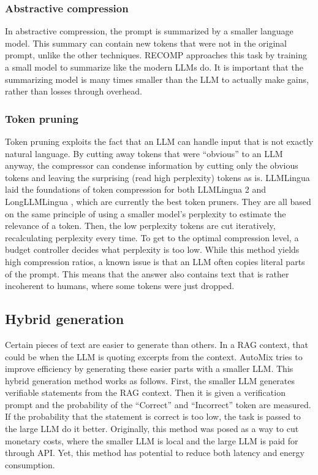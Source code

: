 \subsubsection{Abstractive compression}
In abstractive compression, the prompt is summarized by a smaller language model. This summary can contain new tokens that were not in the original prompt, unlike the other techniques. RECOMP \cite{xu2023recomp} approaches this task by training a small model to summarize like the modern LLMs do. It is important that the summarizing model is many times smaller than the LLM to actually make gains, rather than losses through overhead.

\subsubsection{Token pruning}
Token pruning exploits the fact that an LLM can handle input that is not exactly natural language. By cutting away tokens that were ``obvious'' to an LLM anyway, the compressor can condense information by cutting only the obvious tokens and leaving the surprising (read high perplexity) tokens as is. LLMLingua \cite{jiang2023llmlingua} laid the foundations of token compression for both LLMLingua 2 \cite{pan2024llmlingua2} and LongLLMLingua \cite{jiang2023longllmlingua}, which are currently the best token pruners. They are all based on the same principle of using a smaller model's perplexity to estimate the relevance of a token. Then, the low perplexity tokens are cut iteratively, recalculating perplexity every time. To get to the optimal compression level, a budget controller decides what perplexity is too low. While this method yields high compression ratios, a known issue is that an LLM often copies literal parts of the prompt. This means that the answer also contains text that is rather incoherent to humans, where some tokens were just dropped.

\subsection{Hybrid generation}
Certain pieces of text are easier to generate than others. In a RAG context, that could be when the LLM is quoting excerpts from the context. AutoMix tries to improve efficiency by generating these easier parts with a smaller LLM. This hybrid generation method works as follows. First, the smaller LLM generates verifiable statements from the RAG context. Then it is given a verification prompt and the probability of the ``Correct'' and ``Incorrect'' token are measured. If the probability that the statement is correct is too low, the task is passed to the large LLM do it better. Originally, this method was posed as a way to cut monetary costs, where the smaller LLM is local and the large LLM is paid for through API. Yet, this method has potential to reduce both latency and energy consumption.

